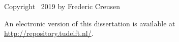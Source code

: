 \begin{titlepage}
\vspace{4\bigskipamount}

\noindent Copyright \textcopyright\ 2019 by Frederic Creusen %



\medskip
\noindent An electronic version of this dissertation is available at \\
\url{http://repository.tudelft.nl/}.

\end{titlepage}

